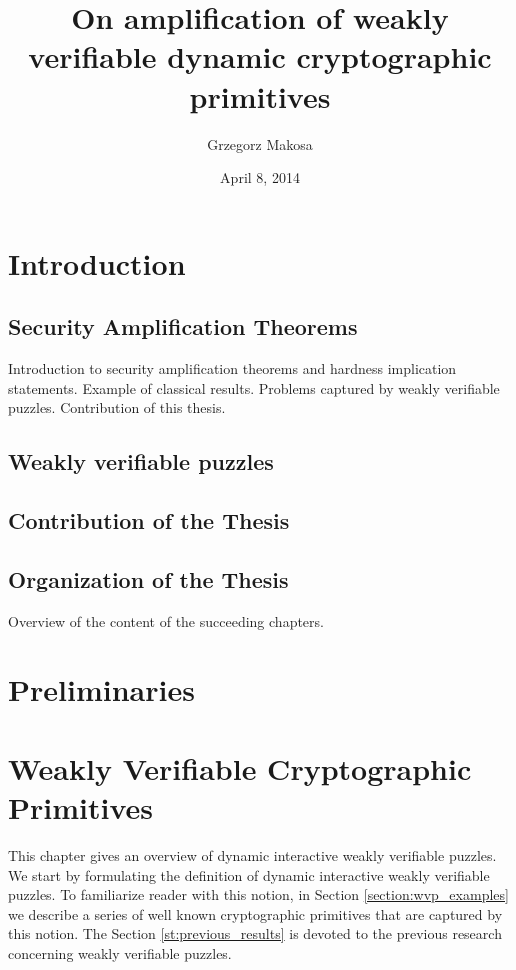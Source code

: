 \documentclass[11pt,a4paper,titlepage]{memoir}
\title{On amplification of weakly verifiable dynamic cryptographic primitives}
\author{Grzegorz Makosa}
\date{April 8, 2014}
\begin{document}
\frontmatter

%

\cleartorecto
\tableofcontents
\mainmatter

\chapter{Introduction}
\section{Security Amplification Theorems}
Introduction to security amplification theorems and hardness implication statements.
Example of classical results. Problems captured by weakly verifiable puzzles.
Contribution of this thesis.
\section{Weakly verifiable puzzles}
\section{Contribution of the Thesis}
\section{Organization of the Thesis}
Overview of the content of the succeeding chapters.

\chapter{Preliminaries}


\chapter{Weakly Verifiable Cryptographic Primitives}
This chapter gives an overview of dynamic interactive weakly verifiable puzzles.
We start by formulating the definition of dynamic interactive weakly verifiable puzzles.
To familiarize reader with this notion, in Section \ref{section:wvp_examples} we describe
a series of well known cryptographic primitives that are captured by this notion.
The Section \ref{st:previous_results} is devoted to the previous research concerning weakly verifiable puzzles.
\end{document}
